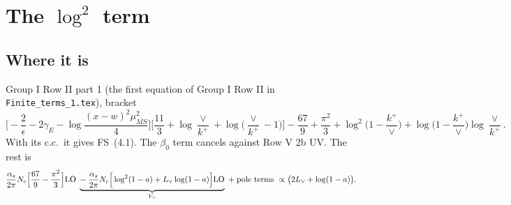 \documentclass[10pt]{article}
\numberwithin{equation}{section}
\newcommand{\Lv}{L_{\vee}}
\begin{document}
\section{The \texorpdfstring{$\log^2$}{log2} term}\label{sec:log2}
\subsection{Where it is}
Group I Row II part 1 (the first equation of Group I Row II in \texttt{Finite\_terms\_1.tex}), bracket
\begin{equation}
\Big[-\frac2\epsilon-2\gamma_E-\log\frac{(x-w)^2\mu^2_{\overline{MS}}}{4}\Big]\Big[\frac{11}{3}+\log\frac{\vee}{k^+}+\log\Big(\frac{\vee}{k^+}-1\Big)\Big]-\frac{67}{9}+\frac{\pi^2}{3}+\log^2\Big(1-\frac{k^+}{\vee}\Big)+\log\Big(1-\frac{k^+}{\vee}\Big)\log\frac{\vee}{k^+}.
\label{eq:bracket}
\end{equation}
With its c.c.\ it gives FS~(4.1). The $\beta_0$ term cancels against Row V 2b UV. The rest is
\begin{equation}
\frac{\alpha_s}{2\pi}N_c\Big[\frac{67}{9}-\frac{\pi^2}{3}\Big]{\rm LO}\;\underbrace{-\;\frac{\alpha_s}{2\pi}N_c\Big[\log^2(1-a)+\Lv\log(1-a)\Big]{\rm LO}}_{V_\vee}
\;+\;\text{pole terms}\ \propto\big(2\Lv+\log(1-a)\big).
\end{equation}
\end{document}
